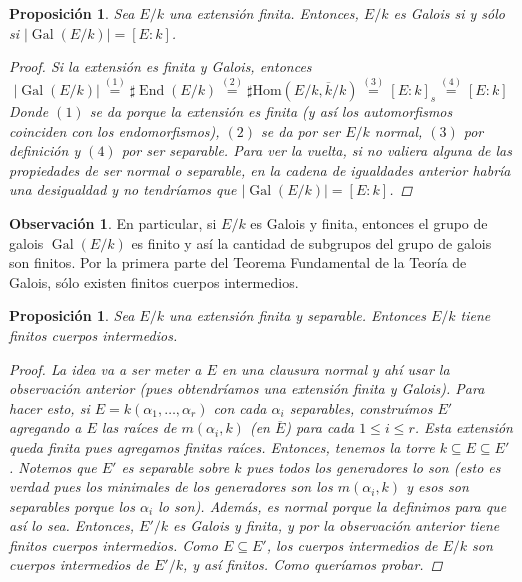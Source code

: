 \documentclass[12pt]{book}
\newtheorem{prop}[teo]{Proposición}
\theoremstyle{definition}
\newtheorem{obs}[teo]{Observación}
\renewcommand{\hom}{\mathrm{Hom}}
\DeclareMathOperator{\End}{End}
\DeclareMathOperator{\Gal}{Gal}
\begin{document}
\begin{prop}
Sea $E/k$ una extensión finita. Entonces, $E/k$ es Galois si y sólo si $|\Gal(E/k)| = [E:k]$.
\begin{proof}
Si la extensión es finita y Galois, entonces $$|\Gal(E/k)| \stackrel{(1)}{=} \sharp\End(E/k) \stackrel{(2)}{=} \sharp \hom(E/k,\overline{k}/k) \stackrel{(3)}{=} [E:k]_s \stackrel{(4)}{=} [E:k]$$ Donde $(1)$ se da porque la extensión es finita (y así los automorfismos coinciden con los endomorfismos), $(2)$ se da por ser $E/k$ normal, $(3)$ por definición y $(4)$ por ser separable. Para ver la vuelta, si no valiera alguna de las propiedades de ser normal o separable, en la cadena de igualdades anterior habría una desigualdad y no tendríamos que $|\Gal(E/k)|= [E:k]$.
\end{proof}
\end{prop}

\begin{obs}
En particular, si $E/k$ es Galois y finita, entonces el grupo de galois $\Gal(E/k)$ es finito y así la cantidad de subgrupos del grupo de galois son finitos. Por la primera parte del Teorema Fundamental de la Teoría de Galois, sólo existen finitos cuerpos intermedios.
\end{obs}

\begin{prop}
Sea $E/k$ una extensión finita y separable. Entonces $E/k$ tiene finitos cuerpos intermedios.
\begin{proof}
La idea va a ser meter a $E$ en una \textit{clausura normal} y ahí usar la observación anterior (pues obtendríamos una extensión finita y Galois). Para hacer esto, si $E=k(\alpha_1,\ldots , \alpha_r)$ con cada $\alpha_i$ separables, construímos $E'$ agregando a $E$ las raíces de $m(\alpha_i,k)$ (en $\overline{E}$) para cada $1\leq i\leq r$. Esta extensión queda finita pues agregamos finitas raíces. Entonces, tenemos la torre $k\subseteq E\subseteq E'$. Notemos que $E'$ es separable sobre $k$ pues todos los generadores lo son (esto es verdad pues los minimales de los generadores son los $m(\alpha_i,k)$ y esos son separables porque los $\alpha_i$ lo son). Además, es normal porque la definimos para que así lo sea. Entonces, $E'/k$ es Galois y finita, y por la observación anterior tiene finitos cuerpos intermedios. Como $E\subseteq E'$, los cuerpos intermedios de $E/k$ son cuerpos intermedios de $E'/k$, y así finitos. Como queríamos probar.
\end{proof}
\end{prop}
\end{document}
